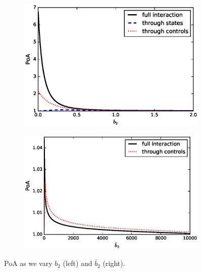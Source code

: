 \documentclass[11pt]{article}
\begin{document}
\begin{figure}[!htb]
    \centering
    \begin{subfigure}{.45\textwidth}
        \includegraphics[scale=0.5]{PoA_half_more_steps_b2.eps}
    \end{subfigure}
    \begin{subfigure}{.45\textwidth}
        \includegraphics[scale=0.5]{PoA_half_even_more_steps_b2bar_2.eps}
    \end{subfigure}
    \caption{PoA as we vary $b_2$ (left) and $\bar{b}_2$ (right).}
    \label{fig:b2_b2bar}
\end{figure}
\end{document}
